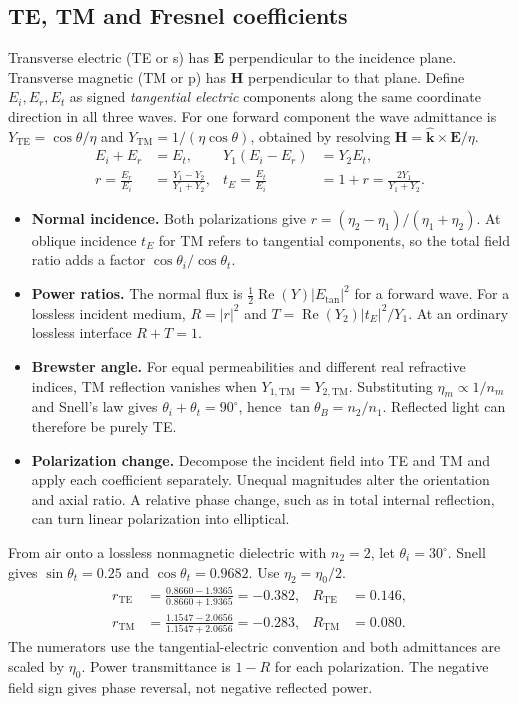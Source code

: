 \documentclass[12pt,a4paper]{article}
\begin{document}
\subsection{TE, TM and Fresnel coefficients}
Transverse electric (TE or s) has $\mathbf E$ perpendicular to the incidence plane. Transverse magnetic (TM or p) has $\mathbf H$ perpendicular to that plane. Define $E_i,E_r,E_t$ as signed \emph{tangential electric} components along the same coordinate direction in all three waves. For one forward component the wave admittance is $Y_{\mathrm{TE}}=\cos\theta/\eta$ and $Y_{\mathrm{TM}}=1/(\eta\cos\theta)$, obtained by resolving $\mathbf H=\hat{\mathbf k}\times\mathbf E/\eta$.
\[
\begin{aligned}
E_i+E_r &= E_t,&
Y_1(E_i-E_r)&=Y_2E_t,\\
r=\frac{E_r}{E_i}&=\frac{Y_1-Y_2}{Y_1+Y_2},&
t_E=\frac{E_t}{E_i}&=1+r=\frac{2Y_1}{Y_1+Y_2}.
\end{aligned}
\]
\begin{itemize}[leftmargin=*,itemsep=3pt]
\item \textbf{Normal incidence.} Both polarizations give $r=(\eta_2-\eta_1)/(\eta_1+\eta_2)$. At oblique incidence $t_E$ for TM refers to tangential components, so the total field ratio adds a factor $\cos\theta_i/\cos\theta_t$.
\item \textbf{Power ratios.} The normal flux is $\tfrac12\operatorname{Re}(Y)|E_{\tan}|^2$ for a forward wave. For a lossless incident medium, $R=|r|^2$ and $T=\operatorname{Re}(Y_2)|t_E|^2/Y_1$. At an ordinary lossless interface $R+T=1$.
\item \textbf{Brewster angle.} For equal permeabilities and different real refractive indices, TM reflection vanishes when $Y_{1,\mathrm{TM}}=Y_{2,\mathrm{TM}}$. Substituting $\eta_m\propto1/n_m$ and Snell's law gives $\theta_i+\theta_t=90^\circ$, hence $\tan\theta_B=n_2/n_1$. Reflected light can therefore be purely TE.
\item \textbf{Polarization change.} Decompose the incident field into TE and TM and apply each coefficient separately. Unequal magnitudes alter the orientation and axial ratio. A relative phase change, such as in total internal reflection, can turn linear polarization into elliptical.
\end{itemize}
\begin{tcolorbox}[examplebox,title={Compare TE and TM power reflection at oblique incidence}]
From air onto a lossless nonmagnetic dielectric with $n_2=2$, let $\theta_i=30^\circ$. Snell gives $\sin\theta_t=0.25$ and $\cos\theta_t=0.9682$. Use $\eta_2=\eta_0/2$.
\[
\begin{aligned}
 r_{\mathrm{TE}}&=\frac{0.8660-1.9365}{0.8660+1.9365}
                  =-0.382,& R_{\mathrm{TE}}&=0.146,\\
 r_{\mathrm{TM}}&=\frac{1.1547-2.0656}{1.1547+2.0656}
                  =-0.283,& R_{\mathrm{TM}}&=0.080.
\end{aligned}
\]
The numerators use the tangential-electric convention and both admittances are scaled by $\eta_0$. Power transmittance is $1-R$ for each polarization. The negative field sign gives phase reversal, not negative reflected power.
\end{tcolorbox}
\end{document}
